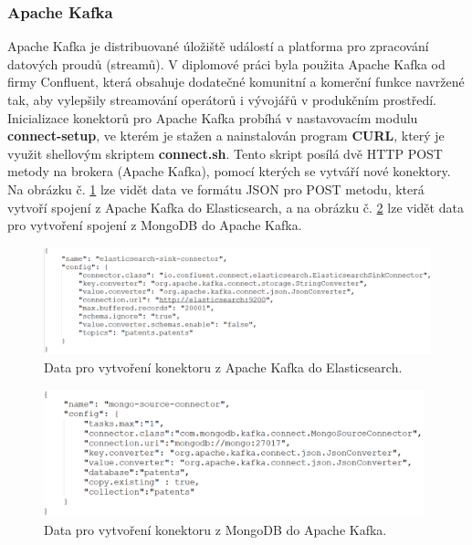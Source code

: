 \subsubsection{Apache Kafka}
Apache Kafka je distribuované úložiště událostí a platforma pro zpracování datových proudů (streamů). V diplomové práci byla použita Apache Kafka od firmy Confluent, která obsahuje dodatečné komunitní a komerční funkce navržené tak, aby vylepšily streamování operátorů i vývojářů v produkčním prostředí.
\newline
\indent Inicializace konektorů pro Apache Kafka probíhá v nastavovacím modulu \textbf{connect-setup}, ve kterém je stažen a nainstalován program \textbf{CURL}, který je využit shellovým skriptem \textbf{connect.sh}. Tento skript posílá dvě \gls{HTTP} POST metody na brokera (Apache Kafka), pomocí kterých se vytváří nové konektory. Na obrázku č. \ref{fig:sink} lze vidět data ve formátu JSON pro POST metodu, která vytvoří spojení z Apache Kafka do Elasticsearch, a na obrázku č. \ref{fig:source} lze vidět data pro vytvoření spojení z MongoDB do Apache Kafka.
\begin{figure}[H]
\centering
\includegraphics[width=12cm]{img/sink}
\caption{Data pro vytvoření konektoru z Apache Kafka do Elasticsearch.}
\label{fig:sink}
\end{figure}
\begin{figure}[H]
\centering
\includegraphics[width=11cm]{img/source}
\caption{Data pro vytvoření konektoru z MongoDB do Apache Kafka.}
\label{fig:source}
\end{figure}